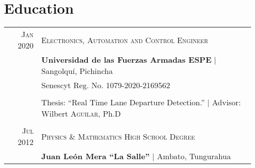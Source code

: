 \documentclass[a4paper,10.9pt]{article}
\begin{document}
\section{Education}
\begin{tabular}{r|l}	
 \textsc{Jan} 2020& \textsc{Electronics, Automation and Control Engineer}\\&
 \textbf{Universidad de las Fuerzas Armadas ESPE} | Sangolquí, Pichincha\\
&Senescyt Reg. No. 1079-2020-2169562\\
\\
& Thesis: ``Real Time Lane Departure Detection.'' | \small Advisor: Wilbert \textsc{Aguilar}, Ph.D\\
\multicolumn{2}{c}{} \\
 \textsc{Jul} 2012 &  \textsc{Physics \& Mathematics High School Degree}\\&
 \textbf{Juan León Mera “La Salle”} | Ambato, Tungurahua\\
\end{tabular}

\end{document}
